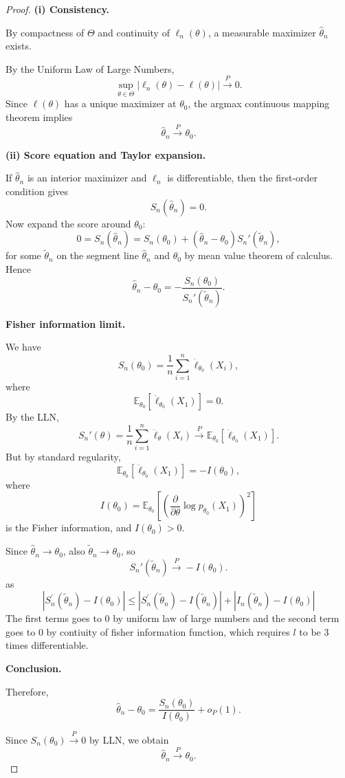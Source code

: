 \documentclass[11pt]{article}
\theoremstyle{definition}
\begin{document}
\begin{proof}
\textbf{(i) Consistency.}

By compactness of $\Theta$ and continuity of $\ell_n(\theta)$,
a measurable maximizer $\hat\theta_n$ exists.

By the Uniform Law of Large Numbers,
\[
\sup_{\theta\in\Theta}
|\ell_n(\theta)-\ell(\theta)|
\xrightarrow{P}0.
\]
Since $\ell(\theta)$ has a unique maximizer at $\theta_0$,
the argmax continuous mapping theorem implies
\[
\hat\theta_n \xrightarrow{P} \theta_0.
\]

\textbf{(ii) Score equation and Taylor expansion.}

If $\hat\theta_n$ is an interior maximizer and
$\ell_n$ is differentiable,
then the first-order condition gives
\[
S_n(\hat\theta_n)=0.
\]
Now expand the score around $\theta_0$:
\[
0
=
S_n(\hat\theta_n)
=
S_n(\theta_0)
+
(\hat\theta_n-\theta_0)
S_n'(\tilde\theta_n),
\]
for some $\tilde\theta_n$ on the segment line $\hat\theta_n$
and $\theta_0$ by mean value theorem of calculus. Hence
\[
\hat\theta_n-\theta_0
=
-\frac{S_n(\theta_0)}{S_n'(\tilde\theta_n)}.
\]

\textbf{Fisher information limit.}

We have
\[
S_n(\theta_0)
=
\frac{1}{n}\sum_{i=1}^n
\dot\ell_{\theta_0}(X_i),
\]
where
\[
\mathbb{E}_{\theta_0}[\dot\ell_{\theta_0}(X_1)]=0.
\]
By the LLN,
\[
S_n'(\theta)
=
\frac{1}{n}\sum_{i=1}^n
\ddot\ell_\theta(X_i)
\xrightarrow{P}
\mathbb{E}_{\theta_0}[\ddot\ell_{\theta_0}(X_1)].
\]
But by standard regularity,
\[
\mathbb{E}_{\theta_0}[\ddot\ell_{\theta_0}(X_1)]
=
- I(\theta_0),
\]
where
\[
I(\theta_0)
=
\mathbb{E}_{\theta_0}
\left[
\left(
\frac{\partial}{\partial\theta}
\log p_{\theta_0}(X_1)
\right)^2
\right]
\]
is the Fisher information,
and $I(\theta_0)>0$.

Since $\hat\theta_n \to \theta_0$,
also $\tilde\theta_n \to \theta_0$,
so
\[
S_n'(\tilde\theta_n)
\xrightarrow{P}
- I(\theta_0).
\]
as
\[
|S^\prime_n(\tilde\theta_n) - I(\theta_0)|\leq |S^\prime_n(\tilde\theta_n) - I(\tilde\theta_n)| + |I_n(\tilde\theta_n) - I(\theta_0)|
\]
The first terms goes to 0 by uniform law of large numbers and the second term goes to 0 by contiuity of fisher information function, which requires $l$ to be 3 times differentiable.
\bigskip

\textbf{Conclusion.}

Therefore,
\[
\hat\theta_n-\theta_0
=
\frac{S_n(\theta_0)}{I(\theta_0)}
+
o_P(1).
\]

Since $S_n(\theta_0)\xrightarrow{P}0$ by LLN,
we obtain
\[
\hat\theta_n \xrightarrow{P} \theta_0.
\]

\end{proof}
\end{document}
